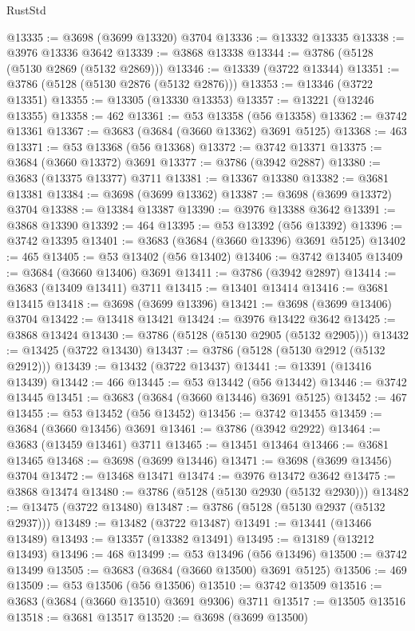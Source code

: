 \begin{lexlean}{RustStd}
\begin{coremodule}
@13335 := @3698 (@3699 @13320) @3704
@13336 := @13332 @13335
@13338 := @3976 @13336 @3642
@13339 := @3868 @13338
@13344 := @3786 (@5128 (@5130 @2869 (@5132 @2869)))
@13346 := @13339 (@3722 @13344)
@13351 := @3786 (@5128 (@5130 @2876 (@5132 @2876)))
@13353 := @13346 (@3722 @13351)
@13355 := @13305 (@13330 @13353)
@13357 := @13221 (@13246 @13355)
@13358 := 462
@13361 := @53 @13358 (@56 @13358)
@13362 := @3742 @13361
@13367 := @3683 (@3684 (@3660 @13362) @3691 @5125)
@13368 := 463
@13371 := @53 @13368 (@56 @13368)
@13372 := @3742 @13371
@13375 := @3684 (@3660 @13372) @3691
@13377 := @3786 (@3942 @2887)
@13380 := @3683 (@13375 @13377) @3711
@13381 := @13367 @13380
@13382 := @3681 @13381
@13384 := @3698 (@3699 @13362)
@13387 := @3698 (@3699 @13372) @3704
@13388 := @13384 @13387
@13390 := @3976 @13388 @3642
@13391 := @3868 @13390
@13392 := 464
@13395 := @53 @13392 (@56 @13392)
@13396 := @3742 @13395
@13401 := @3683 (@3684 (@3660 @13396) @3691 @5125)
@13402 := 465
@13405 := @53 @13402 (@56 @13402)
@13406 := @3742 @13405
@13409 := @3684 (@3660 @13406) @3691
@13411 := @3786 (@3942 @2897)
@13414 := @3683 (@13409 @13411) @3711
@13415 := @13401 @13414
@13416 := @3681 @13415
@13418 := @3698 (@3699 @13396)
@13421 := @3698 (@3699 @13406) @3704
@13422 := @13418 @13421
@13424 := @3976 @13422 @3642
@13425 := @3868 @13424
@13430 := @3786 (@5128 (@5130 @2905 (@5132 @2905)))
@13432 := @13425 (@3722 @13430)
@13437 := @3786 (@5128 (@5130 @2912 (@5132 @2912)))
@13439 := @13432 (@3722 @13437)
@13441 := @13391 (@13416 @13439)
@13442 := 466
@13445 := @53 @13442 (@56 @13442)
@13446 := @3742 @13445
@13451 := @3683 (@3684 (@3660 @13446) @3691 @5125)
@13452 := 467
@13455 := @53 @13452 (@56 @13452)
@13456 := @3742 @13455
@13459 := @3684 (@3660 @13456) @3691
@13461 := @3786 (@3942 @2922)
@13464 := @3683 (@13459 @13461) @3711
@13465 := @13451 @13464
@13466 := @3681 @13465
@13468 := @3698 (@3699 @13446)
@13471 := @3698 (@3699 @13456) @3704
@13472 := @13468 @13471
@13474 := @3976 @13472 @3642
@13475 := @3868 @13474
@13480 := @3786 (@5128 (@5130 @2930 (@5132 @2930)))
@13482 := @13475 (@3722 @13480)
@13487 := @3786 (@5128 (@5130 @2937 (@5132 @2937)))
@13489 := @13482 (@3722 @13487)
@13491 := @13441 (@13466 @13489)
@13493 := @13357 (@13382 @13491)
@13495 := @13189 (@13212 @13493)
@13496 := 468
@13499 := @53 @13496 (@56 @13496)
@13500 := @3742 @13499
@13505 := @3683 (@3684 (@3660 @13500) @3691 @5125)
@13506 := 469
@13509 := @53 @13506 (@56 @13506)
@13510 := @3742 @13509
@13516 := @3683 (@3684 (@3660 @13510) @3691 @9306) @3711
@13517 := @13505 @13516
@13518 := @3681 @13517
@13520 := @3698 (@3699 @13500)

\end{coremodule}
\end{lexlean}

